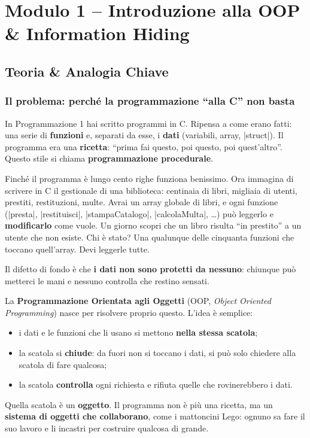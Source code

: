 \chapter{Modulo 1 -- Introduzione alla OOP \& Information Hiding}

\section{Teoria \& Analogia Chiave}

\subsection*{Il problema: perché la programmazione ``alla C'' non basta}

In Programmazione 1 hai scritto programmi in C. Ripensa a come erano fatti:
una serie di \textbf{funzioni} e, separati da esse, i \textbf{dati}
(variabili, array, \cc|struct|). Il programma era una \textbf{ricetta}:
``prima fai questo, poi questo, poi quest'altro''. Questo stile si chiama
\textbf{programmazione procedurale}.

Finché il programma è lungo cento righe funziona benissimo. Ora immagina di
scrivere in C il gestionale di una biblioteca: centinaia di libri, migliaia di
utenti, prestiti, restituzioni, multe. Avrai un array globale di libri, e ogni
funzione (\cc|presta|, \cc|restituisci|, \cc|stampaCatalogo|, \cc|calcolaMulta|,
\ldots) può leggerlo e \textbf{modificarlo} come vuole. Un giorno scopri che un
libro risulta ``in prestito'' a un utente che non esiste. Chi è stato? Una
qualunque delle cinquanta funzioni che toccano quell'array. Devi leggerle
tutte.

Il difetto di fondo è che \textbf{i dati non sono protetti da nessuno}:
chiunque può metterci le mani e nessuno controlla che restino sensati.

La \textbf{Programmazione Orientata agli Oggetti} (OOP, \emph{Object Oriented
Programming}) nasce per risolvere proprio questo. L'idea è semplice:
\begin{itemize}
  \item i dati e le funzioni che li usano si mettono \textbf{nella stessa scatola};
  \item la scatola si \textbf{chiude}: da fuori non si toccano i dati, si può solo
        chiedere alla scatola di fare qualcosa;
  \item la scatola \textbf{controlla} ogni richiesta e rifiuta quelle che
        rovinerebbero i dati.
\end{itemize}
Quella scatola è un \textbf{oggetto}. Il programma non è più una ricetta, ma
un \textbf{sistema di oggetti che collaborano}, come i mattoncini Lego: ognuno
sa fare il suo lavoro e li incastri per costruire qualcosa di grande.

